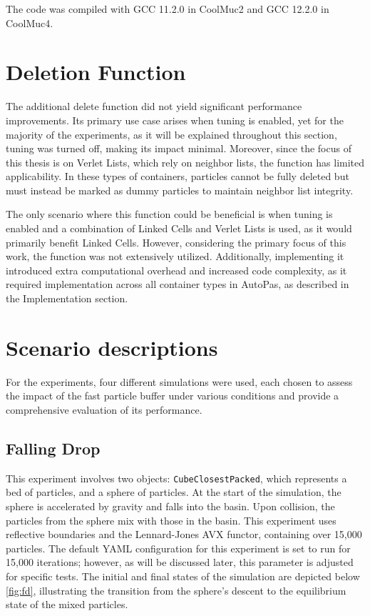 The code was compiled with GCC 11.2.0 in CoolMuc2 and GCC 12.2.0 in CoolMuc4. 

\section{Deletion Function}

The additional delete function did not yield significant performance improvements. Its primary use case arises when tuning is enabled, yet for the majority of the experiments, as it will be explained throughout this section, tuning was turned off, making its impact minimal. Moreover, since the focus of this thesis is on Verlet Lists, which rely on neighbor lists, the function has limited applicability. In these types of containers, particles cannot be fully deleted but must instead be marked as dummy particles to maintain neighbor list integrity.  

The only scenario where this function could be beneficial is when tuning is enabled and a combination of Linked Cells and Verlet Lists is used, as it would primarily benefit Linked Cells. However, considering the primary focus of this work, the function was not extensively utilized. Additionally, implementing it introduced extra computational overhead and increased code complexity, as it required implementation across all container types in AutoPas, as described in the Implementation section.



\section{Scenario descriptions}

For the experiments, four different simulations were used, each chosen to assess the impact of the fast particle buffer under various conditions and provide a comprehensive evaluation of its performance.



\subsection{Falling Drop} 
This experiment involves two objects: \texttt{CubeClosestPacked}, which represents a bed of particles, and a sphere of particles. At the start of the simulation, the sphere is accelerated by gravity and falls into the basin. Upon collision, the particles from the sphere mix with those in the basin. This experiment uses reflective boundaries and the Lennard-Jones AVX functor, containing over 15,000 particles. The default YAML configuration for this experiment is set to run for 15,000 iterations; however, as will be discussed later, this parameter is adjusted for specific tests. The initial and final states of the simulation are depicted below \ref{fig:fd}, illustrating the transition from the sphere's descent to the equilibrium state of the mixed particles.

